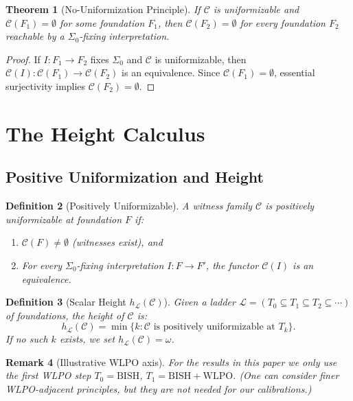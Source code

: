 \documentclass[11pt]{article}
\newtheorem{theorem}{Theorem}[section]
\newtheorem{definition}[theorem]{Definition}
\newtheorem{remark}[theorem]{Remark}
\newcommand{\WLPO}{\mathrm{WLPO}}
\newcommand{\BISH}{\mathrm{BISH}}
\newcommand{\SigmaZero}{\Sigma_{0}}
\begin{document}
\begin{theorem}[No-Uniformization Principle]\label{thm:no-unif}
If $\mathcal{C}$ is uniformizable and $\mathcal{C}(F_1) = \emptyset$ for some foundation $F_1$, then $\mathcal{C}(F_2) = \emptyset$ for every foundation $F_2$ reachable by a $\SigmaZero$-fixing interpretation.
\end{theorem}
\begin{proof}
If $I: F_1 \to F_2$ fixes $\SigmaZero$ and $\mathcal{C}$ is uniformizable, then $\mathcal{C}(I): \mathcal{C}(F_1) \to \mathcal{C}(F_2)$ is an equivalence. Since $\mathcal{C}(F_1) = \emptyset$, essential surjectivity implies $\mathcal{C}(F_2) = \emptyset$.
\end{proof}

\section{The Height Calculus}

\subsection{Positive Uniformization and Height}

\begin{definition}[Positively Uniformizable]
A witness family $\mathcal{C}$ is \emph{positively uniformizable} at foundation $F$ if:
\begin{enumerate}
\item $\mathcal{C}(F) \neq \emptyset$ (witnesses exist), and
\item For every $\SigmaZero$-fixing interpretation $I: F \to F'$, the functor $\mathcal{C}(I)$ is an equivalence.
\end{enumerate}
\end{definition}

\begin{definition}[Scalar Height \(h_{\mathcal L}(\mathcal C)\)]
Given a ladder $\mathcal{L} = (T_0 \subseteq T_1 \subseteq T_2 \subseteq \cdots)$ of foundations, the \emph{height} of $\mathcal{C}$ is:
\[
h_{\mathcal L}(\mathcal{C}) = \min\{k : \mathcal{C} \text{ is positively uniformizable at } T_k\}.
\]
If no such $k$ exists, we set $h_{\mathcal L}(\mathcal{C}) = \omega$.
\end{definition}

\begin{remark}[Illustrative WLPO axis]
For the results in this paper we only use the first WLPO step $T_0=\BISH$, $T_1=\BISH+\WLPO$. (One can consider finer WLPO-adjacent principles, but they are not needed for our calibrations.)
\end{remark}
\end{document}
